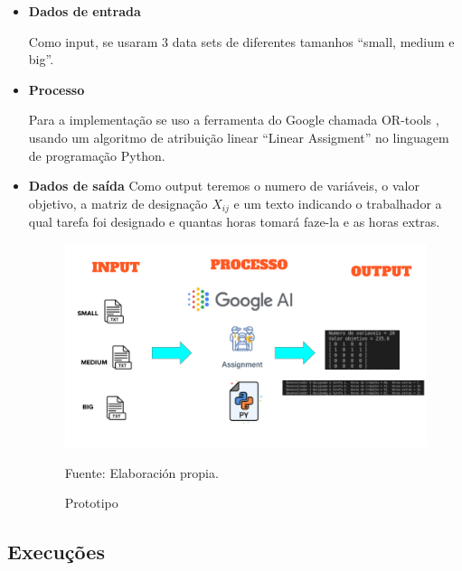 \documentclass[12pt]{article}
\begin{document}
\begin{itemize}
	\item \textbf{Dados de entrada}
	
		Como input, se usaram 3 data sets de diferentes tamanhos ``small, medium e big''.\\
		
	\item \textbf{Processo}
		
		Para a implementação se uso a ferramenta do Google chamada OR-tools \cite{ortools_site}, usando um algoritmo de atribuição linear ``Linear Assigment'' no linguagem de programação Python.\\
		
	\item \textbf{Dados de saída}
		Como output teremos o numero de variáveis, o valor objetivo, a matriz de designação $X_{ij}$ e um texto indicando o trabalhador a qual tarefa foi designado e quantas horas tomará faze-la e as horas extras.

\begin{figure}[!ht]
	\begin{center}
		\includegraphics[width=1\textwidth]{images/prototype}
	\end{center}
	\begin{center}
		\caption{\label{figure:prototype}
			\small{Prototipo}}
		{\small{Fuente: Elaboración propia.}}
	\end{center}
\end{figure}	
		
\end{itemize}

\subsection{Execuções}
\end{document}

